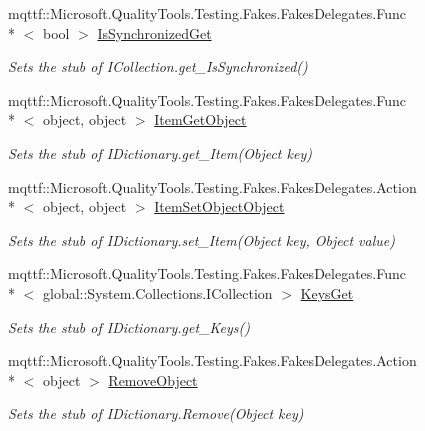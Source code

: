 \begin{DoxyCompactItemize}
mqttf\-::\-Microsoft.\-Quality\-Tools.\-Testing.\-Fakes.\-Fakes\-Delegates.\-Func\\*
$<$ bool $>$ \hyperlink{class_system_1_1_collections_1_1_fakes_1_1_stub_i_dictionary_a4f57ce63ee67138abad7f47f3a0c9a5f}{Is\-Synchronized\-Get}
\begin{DoxyCompactList}\small\item\em Sets the stub of I\-Collection.\-get\-\_\-\-Is\-Synchronized()\end{DoxyCompactList}\item 
mqttf\-::\-Microsoft.\-Quality\-Tools.\-Testing.\-Fakes.\-Fakes\-Delegates.\-Func\\*
$<$ object, object $>$ \hyperlink{class_system_1_1_collections_1_1_fakes_1_1_stub_i_dictionary_abae912157ec8cbad25ff21b4d644299e}{Item\-Get\-Object}
\begin{DoxyCompactList}\small\item\em Sets the stub of I\-Dictionary.\-get\-\_\-\-Item(\-Object key)\end{DoxyCompactList}\item 
mqttf\-::\-Microsoft.\-Quality\-Tools.\-Testing.\-Fakes.\-Fakes\-Delegates.\-Action\\*
$<$ object, object $>$ \hyperlink{class_system_1_1_collections_1_1_fakes_1_1_stub_i_dictionary_a50b5765802ede4af59d4525035c84ba1}{Item\-Set\-Object\-Object}
\begin{DoxyCompactList}\small\item\em Sets the stub of I\-Dictionary.\-set\-\_\-\-Item(\-Object key, Object value)\end{DoxyCompactList}\item 
mqttf\-::\-Microsoft.\-Quality\-Tools.\-Testing.\-Fakes.\-Fakes\-Delegates.\-Func\\*
$<$ global\-::\-System.\-Collections.\-I\-Collection $>$ \hyperlink{class_system_1_1_collections_1_1_fakes_1_1_stub_i_dictionary_a95e29d890299fa624b8ef35ac809bd18}{Keys\-Get}
\begin{DoxyCompactList}\small\item\em Sets the stub of I\-Dictionary.\-get\-\_\-\-Keys()\end{DoxyCompactList}\item 
mqttf\-::\-Microsoft.\-Quality\-Tools.\-Testing.\-Fakes.\-Fakes\-Delegates.\-Action\\*
$<$ object $>$ \hyperlink{class_system_1_1_collections_1_1_fakes_1_1_stub_i_dictionary_af1641d3ce06cd535a5fbe77ec86d8518}{Remove\-Object}
\begin{DoxyCompactList}\small\item\em Sets the stub of I\-Dictionary.\-Remove(\-Object key)\end{DoxyCompactList}\item 

\end{DoxyCompactItemize}
